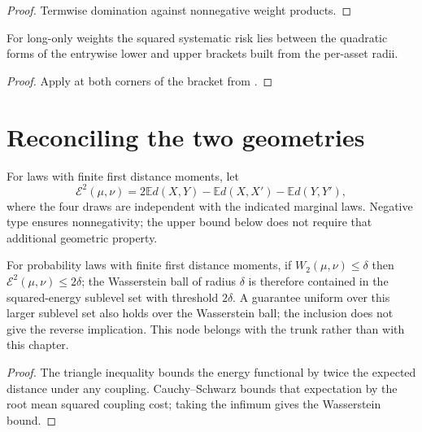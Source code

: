 \begin{proof}
  Termwise domination against nonnegative weight products.
\end{proof}

\begin{theorem}
  \label{thm:robust-envelope}
  For long-only weights the squared systematic risk lies between the quadratic
  forms of the entrywise lower and upper brackets built from the per-asset
  radii.
\end{theorem}

\begin{proof}
  Apply  at both corners of the bracket from
  .
\end{proof}

\section{Reconciling the two geometries}

\begin{definition}
  \label{def:energy-distance}
  For laws with finite first distance moments, let
  \[
    \mathcal E^2(\mu,\nu)
    =2\mathbb E d(X,Y)-\mathbb E d(X,X')-\mathbb E d(Y,Y'),
  \]
  where the four draws are independent with the indicated marginal laws.
  Negative type ensures nonnegativity; the upper bound below does not require
  that additional geometric property.
\end{definition}

\begin{theorem}
  \label{thm:ball-inclusion}
  For probability laws with finite first distance moments, if
  \(W_2(\mu,\nu)\le\delta\) then \(\mathcal E^2(\mu,\nu)\le 2\delta\); the
  Wasserstein ball of radius \(\delta\) is therefore contained in the
  squared-energy sublevel set with threshold \(2\delta\).
  A guarantee uniform over this larger sublevel set also holds over the
  Wasserstein ball; the inclusion does not give the reverse implication.
  This node belongs with the trunk rather than with this chapter.
\end{theorem}

\begin{proof}
  The triangle inequality bounds the energy functional by twice the expected
  distance under any coupling.
  Cauchy--Schwarz bounds that expectation by the root mean squared coupling
  cost; taking the infimum gives the Wasserstein bound.
\end{proof}
